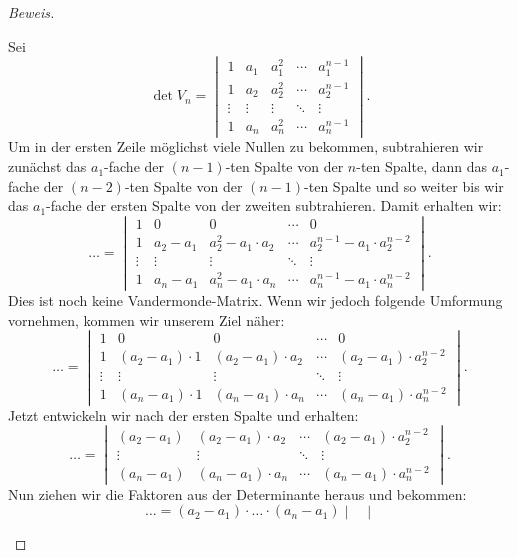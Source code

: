 \documentclass[12pt, a4paper, oneside, titlepage]{report}
\newenvironment{bew}{\begin{proof}[Beweis]}{\end{proof}}
\theoremstyle{definition}
\begin{document}
\begin{bew}
\begin{itemize}
{				Sei $$ \det V_n =
				\begin{vmatrix}
				1 & a_1 & a_1^2 & \cdots & a_1^{n-1} \\
				1 & a_2 & a_2^2 & \cdots & a_2^{n-1} \\
				\vdots & \vdots & \vdots & \ddots & \vdots \\     
				1 & a_n & a_n^2 & \cdots & a_n^{n-1}
				\end{vmatrix}.$$
				Um in der ersten Zeile möglichst viele Nullen zu bekommen, subtrahieren wir zunächst das $ a_1 $-fache der $ (n-1) $-ten Spalte von der $ n $-ten Spalte, dann das $ a_1 $-fache der $ (n-2) $-ten Spalte von der $ (n-1) $-ten Spalte und so weiter bis wir das $ a_1 $-fache der ersten Spalte von der zweiten subtrahieren. Damit erhalten wir:
				$$ \ldots = 
				\begin{vmatrix}
				1 & 0 & 0 & \cdots & 0 \\
				1 & a_2 - a_1 & a_2^2 - a_1 \cdot a_2 & \cdots & a_2^{n-1} - a_1 \cdot a_2^{n-2} \\
				\vdots & \vdots & \vdots & \ddots & \vdots \\     
				1 & a_n - a_1 & a_n^2 - a_1 \cdot a_n & \cdots & a_n^{n-1} - a_1 \cdot a_n^{n-2}
				\end{vmatrix}.$$
				Dies ist noch keine Vandermonde-Matrix. Wenn wir jedoch folgende Umformung vornehmen, kommen wir unserem Ziel näher:
				$$ \ldots = 
				\begin{vmatrix}
				1 & 0 & 0 & \cdots & 0 \\
				1 & (a_2 - a_1) \cdot 1 & (a_2 - a_1) \cdot a_2 & \cdots & (a_2 - a_1) \cdot a_2^{n-2} \\
				\vdots & \vdots & \vdots & \ddots & \vdots \\     
				1 & (a_n - a_1) \cdot 1 & (a_n - a_1) \cdot a_n & \cdots & (a_n - a_1) \cdot a_n^{n-2}
				\end{vmatrix}.$$
				Jetzt entwickeln wir nach der ersten Spalte und erhalten:
				$$ \ldots = \begin{vmatrix}
				(a_2 - a_1) & (a_2 - a_1) \cdot a_2 & \cdots & (a_2 - a_1) \cdot a_2^{n-2} \\
				\vdots & \vdots & \ddots & \vdots \\     
				(a_n - a_1) & (a_n - a_1) \cdot a_n & \cdots & (a_n - a_1) \cdot a_n^{n-2}
				\end{vmatrix}.$$
				Nun ziehen wir die Faktoren aus der Determinante heraus und bekommen:
				$$ \ldots = (a_2 - a_1) \cdot \ldots \cdot (a_n - a_1)
				\begin{vmatrix}

\end{vmatrix}$$}
\end{itemize}
\end{bew}
\end{document}
